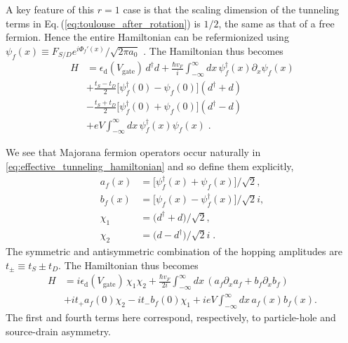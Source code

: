 \documentclass[aps,prb,reprint,floatfix,superscriptaddress,amssymb,amsmath]{revtex4-2}
\newcommand{\phdag}{{\phantom{\dagger}}}
\newcommand{\Vg}{V_\text{gate}}
\newcommand{\hub}[1]{\textcolor{red}{#1}}
\begin{document}
A key feature of this $r \!=\! 1$ case is that the scaling dimension of the tunneling terms in Eq.\,(\ref{eq:toulouse_after_rotation}) is $1/2$, the same as that of a free fermion. Hence the entire Hamiltonian can be refermionized using $\psi_f (x)\equiv F_{S/D} e^{i\Phi_f' (x)}/\sqrt{2\pi a_0}$ \cite{GogolinBook, Zheng1-GPRB14}. 
The Hamiltonian thus becomes
\begin{equation}
\begin{aligned}
H &= \epsilon_\text{d}(\Vg) \,d^\dagger d 
 + \frac{\hbar v_{F}}{i}\int_{-\infty}^{\infty} \!\!\!dx\, \psi^\dagger_f(x) \partial_x \psi^\phdag_f(x) \\
& + \frac{t_S - t_D}{2} \big[ \psi^\dagger_f(0) - \psi^\phdag_f(0) \big] (d^{\dagger} + d) \\
& - \frac{t_S + t_D}{2} \big[ \psi^\dagger_f(0) + \psi^\phdag_f(0) \big] (d^{\dagger} - d) \\ 
&+ eV \!\int_{-\infty}^{\infty} \!\!\!dx\, \psi^\dagger_f(x)\psi^\phdag_f(x)  \;.
\end{aligned}
\label{eq:effective_tunneling_hamiltonian}
\end{equation}

We see that Majorana fermion operators occur naturally in \eqref{eq:effective_tunneling_hamiltonian} and so define them explicitly,  
\begin{subequations}
\begin{align}
a_f(x) &= \big[ \psi_f^\dagger(x) + \psi_f^\phdag(x) \big]/\sqrt{2}, \\
b_f(x) &= \big[ \psi_f^\phdag(x) - \psi_f^\dagger(x) \big]/\sqrt{2}i, \\
\chi_1^\phdag &=\big(d^{\dagger}+d\big)/\sqrt{2}, \\
\chi_2^\phdag &=\big(d-d^{\dagger}\big)/\sqrt{2}i \;.
\end{align}
\end{subequations}
The symmetric and antisymmetric combination of the hopping amplitudes are
$t_\pm \!\equiv\! t_S \!\pm\! t_D$. 
The Hamiltonian thus becomes
\begin{equation}
\begin{aligned}
H &= i\epsilon_\text{d}(\Vg)\, \chi_1^\phdag\chi_2^\phdag 
+ \frac{\hbar v_{F}}{2i} \int_{-\infty}^{\infty} \!\!\!dx\, \left( a_f \partial_x a_f + b_f \partial_x b_f \right) \\ 
&+ it_+ a_f(0)\chi_2^\phdag - it_- b_f(0)\chi_1^\phdag 
+ i eV \!\int_{-\infty}^{\infty} \!\!\!dx\, a_f(x) b_f(x)  .
\end{aligned}
\label{eq:Hmajorana}
\end{equation}
The first and fourth terms here correspond, respectively, to particle-hole and source-drain asymmetry.
\end{document}
